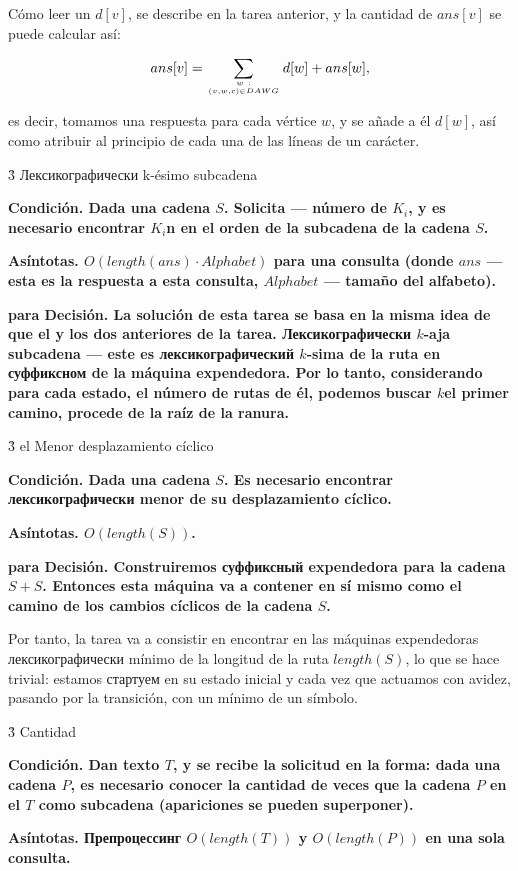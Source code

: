 Cómo leer un $d[v]$, se describe en la tarea anterior, y la cantidad de $ans[v]$ se puede calcular así:

$$ ans[v] = \sum_{w ~ : \atop (v,w,c) \in DAWG} d[w] + ans[w], $$

es decir, tomamos una respuesta para cada vértice $w$, y se añade a él $d[w]$, así como atribuir al principio de cada una de las líneas de un carácter.


\h3{ Лексикографически k-ésimo subcadena }

\bf{Condición}. Dada una cadena $S$. Solicita --- número de $K_i$, y es necesario encontrar $K_i$n en el orden de la subcadena de la cadena $S$.

\bf{Asíntotas}. $O (length (ans) \cdot Alphabet)$ para una consulta (donde $ans$ --- esta es la respuesta a esta consulta, $Alphabet$ --- tamaño del alfabeto).

\bf{para Decisión}. La solución de esta tarea se basa en la misma idea de que el y los dos anteriores de la tarea. Лексикографически $k$-aja subcadena --- este es лексикографический $k$-sima de la ruta en суффиксном de la máquina expendedora. Por lo tanto, considerando para cada estado, el número de rutas de él, podemos buscar $k$el primer camino, procede de la raíz de la ranura.


\h3{ el Menor desplazamiento cíclico }

\bf{Condición}. Dada una cadena $S$. Es necesario encontrar лексикографически menor de su desplazamiento cíclico.

\bf{Asíntotas}. $O (length (S))$.

\bf{para Decisión}. Construiremos суффиксный expendedora para la cadena $S+S$. Entonces esta máquina va a contener en sí mismo como el camino de los cambios cíclicos de la cadena $S$.

Por tanto, la tarea va a consistir en encontrar en las máquinas expendedoras лексикографически mínimo de la longitud de la ruta $length(S)$, lo que se hace trivial: estamos стартуем en su estado inicial y cada vez que actuamos con avidez, pasando por la transición, con un mínimo de un símbolo.


\h3{ Cantidad }

\bf{Condición}. Dan texto $T$, y se recibe la solicitud en la forma: dada una cadena $P$, es necesario conocer la cantidad de veces que la cadena $P$ en el $T$ como subcadena (apariciones se pueden superponer).

\bf{Asíntotas}. Препроцессинг $O (length (T))$ y $O (length (P))$ en una sola consulta.

